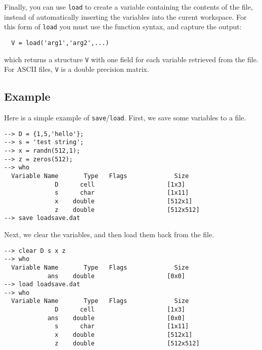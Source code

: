 Finally, you can use \verb|load| to create a variable containing the 
contents of the file, instead of automatically inserting the variables
into the curent workspace.  For this form of \verb|load| you must use the
function syntax, and capture the output:
\begin{verbatim}
  V = load('arg1','arg2',...)
\end{verbatim}
which returns a structure \verb|V| with one field for each variable
retrieved from the file.  For ASCII files, \verb|V| is a double precision
matrix.

\subsection{Example}

Here is a simple example of \verb|save|/\verb|load|.  First, we save some variables to a file.
\begin{verbatim}
--> D = {1,5,'hello'};
--> s = 'test string';
--> x = randn(512,1);
--> z = zeros(512);
--> who
  Variable Name       Type   Flags             Size
              D      cell                    [1x3]
              s      char                    [1x11]
              x    double                    [512x1]
              z    double                    [512x512]
--> save loadsave.dat
\end{verbatim}
Next, we clear the variables, and then load them back from the file.
\begin{verbatim}
--> clear D s x z
--> who
  Variable Name       Type   Flags             Size
            ans    double                    [0x0]
--> load loadsave.dat
--> who
  Variable Name       Type   Flags             Size
              D      cell                    [1x3]
            ans    double                    [0x0]
              s      char                    [1x11]
              x    double                    [512x1]
              z    double                    [512x512]
\end{verbatim}
